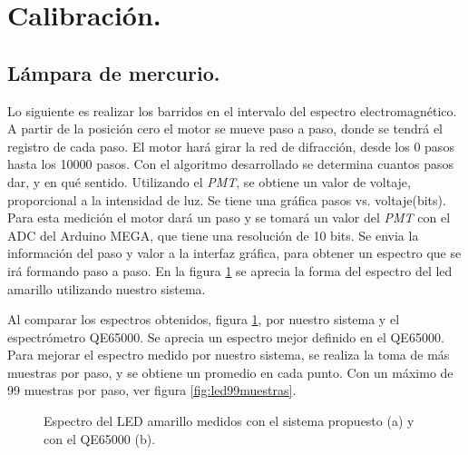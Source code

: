 \section{Calibración.}
\subsection{Lámpara de mercurio.}
Lo siguiente es realizar los barridos en el intervalo del espectro electromagnético. A partir de la posición cero el motor se mueve paso a paso, donde se tendrá el registro de cada paso. El motor hará girar la red de difracción, desde los 0 pasos hasta los 10000 pasos. Con el algoritmo desarrollado se determina cuantos pasos dar, y en qué sentido. Utilizando el \textit{PMT}, se obtiene un valor de voltaje, proporcional a la intensidad de luz. Se tiene una gráfica pasos vs. voltaje(bits). 
Para esta medición el motor dará un paso y se tomará un valor del \textit{PMT} con el ADC del Arduino MEGA, que tiene una resolución de 10 bits. Se envia la información del paso y valor a la interfaz gráfica, para obtener un espectro que se irá formando paso a paso. En la figura \ref{fig:ledqe65} se aprecia la forma del espectro del led amarillo utilizando nuestro sistema. 


Al comparar los espectros obtenidos, figura \ref{fig:ledqe65}, por nuestro sistema y el espectrómetro QE65000. Se aprecia un espectro mejor definido en el QE65000. Para mejorar el espectro medido por nuestro sistema, se realiza la toma de más muestras por paso, y se obtiene un promedio en cada punto. Con un máximo de 99 muestras por paso, ver figura \ref{fig:led99muestras}.
\begin{figure}[h]
	\centering
	\caption{Espectro del LED amarillo medidos con el sistema propuesto (a) y con el QE65000 (b).}
	\label{fig:ledqe65}
\end{figure}

